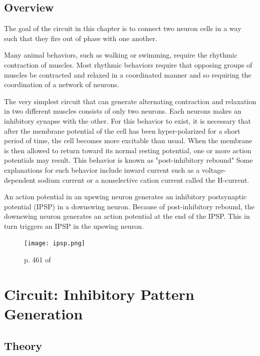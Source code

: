 \documentclass[12]{book}
\newcommand\0{\mathbf{0}}
\newcommand\<{\langle}
\renewcommand\>{\rangle}
\begin{document}
\subsection{Overview}

The goal of the circuit in this chapter is to connect two neuron cells in a way such that they fire out of phase with one another.

Many animal behaviors, such as walking or swimming, require the rhythmic contraction of muscles. Most rhythmic behaviors require that opposing groups of muscles be contracted and relaxed in a coordinated manner and so requiring the coordination of a network of neurons.

The very simplest circuit that can generate alternating contraction and relaxation in two different muscles consists of only two neurons. Each neurons makes an inhibitory synapse with the other. For this behavior to exist, it is necessary that after the membrane potential of the cell has been hyper-polarized for a short period of time, the cell becomes more excitable than usual. When the membrane is then allowed to return toward its normal resting potential, one or more action potentials may result. This behavior is known as "post-inhibitory rebound" Some explanations for such behavior include inward current such as a voltage-dependent sodium current or a nonselective cation current called the H-current.

An action potential in an upswing neuron generates an inhibitory postsynaptic potential (IPSP) in a downswing neuron. Because of post-inhibitory rebound, the downswing neuron generates an action potential at the end of the IPSP. This in turn triggers an IPSP in the upswing neuron.


\begin{figure}[H]
\centering
\texttt{[image: ipsp.png]}	
\caption{p. 461 of \cite{levitan2015neuron}}
\end{figure}

\section{Circuit: Inhibitory Pattern Generation}

\subsection{Theory}
\end{document}
